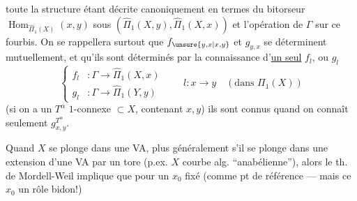 toute la structure étant décrite canoniquement en termes du bitorseur $\operatorname{Hom}_{\widehat\Pi_1(X)}(x,y)$ sous $(\widehat\Pi_1(X,y),\widehat\Pi_1(X,x))$ et l'opération de $\Gamma$ sur  ce fourbis. On se rappellera surtout que $f_{\unsure{y,x|x,y}}$ et $g_{y,x}$ se déterminent mutuellement, et qu'ils sont déterminés par la connaissance d'\uline{un seul}   $f_l$, ou $g_l$
\[
\tag{33}\left\{\begin{aligned}
f_l&:\Gamma\longrightarrow\widehat\Pi_1(X,x)\\
g_l&:\Gamma\longrightarrow\widehat\Pi_1(Y,y)
\end{aligned}\right.
\qquad l:x\longrightarrow y\quad(\text{dans }\Pi_1(X))
\]
(si on a  un $T^\alpha$ $1$-connexe $\subset X$, contenant $x,y$) ils sont connus quand on connaît seulement $g^{T^\alpha}_{x,y}$.


Quand $X$ se plonge dans une VA, plus généralement s'il se plonge dans une extension d'une VA par un tore (p.ex. $X$ courbe alg. ``anabélienne''), alors le th. de Mordell-Weil implique que pour un $x_0$  fixé (comme pt de référence --- mais ce $x_0$   un rôle bidon!)

